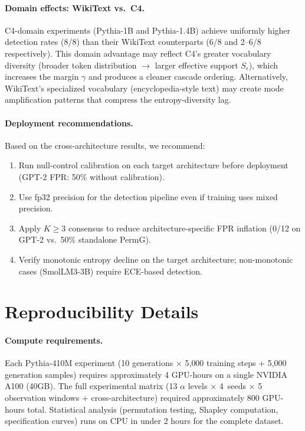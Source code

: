 \paragraph{Domain effects: WikiText vs.\ C4.}
C4-domain experiments (Pythia-1B and Pythia-1.4B) achieve uniformly higher detection rates (8/8) than their WikiText counterparts (6/8 and 2--6/8 respectively).
This domain advantage may reflect C4's greater vocabulary diversity (broader token distribution $\to$ larger effective support $S_\epsilon$), which increases the margin $\gamma$ and produces a cleaner cascade ordering.
Alternatively, WikiText's specialized vocabulary (encyclopedia-style text) may create mode amplification patterns that compress the entropy-diversity lag.

\paragraph{Deployment recommendations.}
Based on the cross-architecture results, we recommend:
\begin{enumerate}
\item Run null-control calibration on each target architecture before deployment (GPT-2 FPR: 50\% without calibration).
\item Use fp32 precision for the detection pipeline even if training uses mixed precision.
\item Apply $K{\geq}3$ consensus to reduce architecture-specific FPR inflation (0/12 on GPT-2 vs.\ 50\% standalone PermG).
\item Verify monotonic entropy decline on the target architecture; non-monotonic cases (SmolLM3-3B) require ECE-based detection.
\end{enumerate}

\FloatBarrier
\section*{Reproducibility Details}
\label{app:reproducibility}

\paragraph{Compute requirements.}
Each Pythia-410M experiment (10 generations $\times$ 5{,}000 training steps $+$ 5{,}000 generation samples) requires approximately 4 GPU-hours on a single NVIDIA A100 (40GB).
The full experimental matrix (13 $\alpha$ levels $\times$ 4~seeds $\times$ 5 observation windows $+$ cross-architecture) required approximately 800 GPU-hours total.
Statistical analysis (permutation testing, Shapley computation, specification curves) runs on CPU in under 2 hours for the complete dataset.

